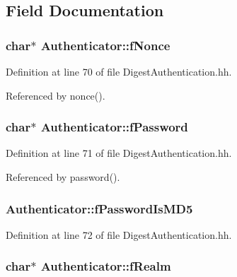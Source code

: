 \subsection{Field Documentation}
\subsubsection[{f\+Nonce}]{\setlength{\rightskip}{0pt plus 5cm}char$\ast$ Authenticator\+::f\+Nonce\hspace{0.3cm}{\ttfamily [private]}}\label{classAuthenticator_a52a2207a407481871c2199a81373fed7}


Definition at line 70 of file Digest\+Authentication.\+hh.



Referenced by nonce().

\subsubsection[{f\+Password}]{\setlength{\rightskip}{0pt plus 5cm}char$\ast$ Authenticator\+::f\+Password\hspace{0.3cm}{\ttfamily [private]}}\label{classAuthenticator_ac215a6ccdcf1b72d5db99170aea64063}


Definition at line 71 of file Digest\+Authentication.\+hh.



Referenced by password().

\subsubsection[{f\+Password\+Is\+M\+D5}]{ Authenticator\+::f\+Password\+Is\+M\+D5\hspace{0.3cm}{\ttfamily [private]}}\label{classAuthenticator_adee5874f80ae73b7f2a0cec37db424b0}


Definition at line 72 of file Digest\+Authentication.\+hh.

\subsubsection[{f\+Realm}]{\setlength{\rightskip}{0pt plus 5cm}char$\ast$ Authenticator\+::f\+Realm\hspace{0.3cm}{\ttfamily [private]}}\label{classAuthenticator_ad069b5f52aa62057f955801a4853ba43}


